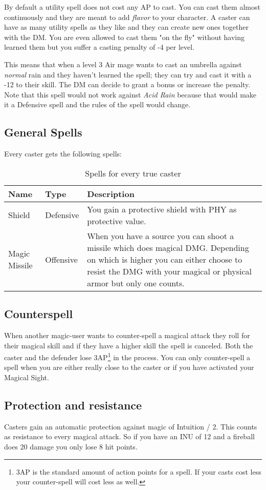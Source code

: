 By default a utility spell does not cost any AP to cast. You can cast them almost continuously and they are meant to add \emph{flavor} to your character. A caster can have as many utility spells as they like and they can create new ones together with the DM. You are even allowed to cast them "on the fly" without having learned them but you suffer a casting penalty of -4 per level.

This means that when a level 3 Air mage wants to cast an umbrella against \emph{normal} rain and they haven't learned the spell; they can try and cast it with a -12 to their skill. The DM can decide to grant a bonus or increase the penalty. Note that this spell would not work against \emph{Acid Rain} because that would make it a Defensive spell and the rules of the spell would change.

\subsection{General Spells}
Every caster gets the following spells:

\begin{table}[H]
\begin{minipage}[b]{0.8\linewidth}
\caption{Spells for every true caster}
\begin{center}
\begin{tabulary}{\linewidth}{p{2.5cm} p{2cm} L}
Name & Type & Description \\
 \hline
Shield & Defensive & You gain a protective shield with PHY as protective value. \\
Magic Missile & Offensive & When you have a source you can shoot a missile which does magical DMG. Depending on which is higher you can either choose to resist the DMG with your magical or physical armor but only one counts.  
\end{tabulary}
\end{center}
\end{minipage}
\end{table}


\subsection{Counterspell}
When another magic-user wants to counter-spell a magical attack they roll for their magical skill and if they have a higher skill the spell is canceled. Both the caster and the defender lose 3AP\footnote{3AP is the standard amount of action points for a spell. If your casts cost less your counter-spell will cost less as well.} in the process. 
\bigbreak
You can only counter-spell a spell when you are either really close to the caster or if you have activated your Magical Sight.

\subsection{Protection and resistance}
Casters gain an automatic protection against magic of Intuition / 2. This counts as resistance to every magical attack. So if you have an INU of 12 and a fireball does 20 damage you only lose 8 hit points.

